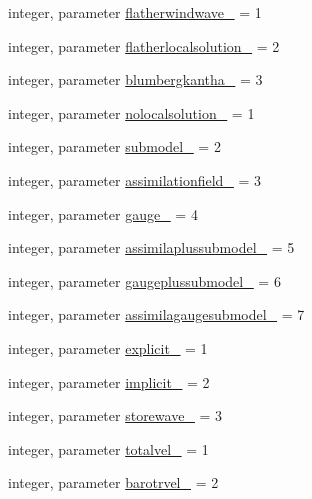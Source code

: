 \begin{DoxyCompactItemize}
\item 
integer, parameter \mbox{\hyperlink{namespacemodulehydrodynamic_afe0c2581319a871292849ef0d657414f}{flatherwindwave\+\_\+}} = 1
\item 
integer, parameter \mbox{\hyperlink{namespacemodulehydrodynamic_a80d3e90e0672cce41d27250b2bd218c1}{flatherlocalsolution\+\_\+}} = 2
\item 
integer, parameter \mbox{\hyperlink{namespacemodulehydrodynamic_a1d590de331d3d84fae20e05e304bbd34}{blumbergkantha\+\_\+}} = 3
\item 
integer, parameter \mbox{\hyperlink{namespacemodulehydrodynamic_acb9771c6b07326240c8f99f13011cdf9}{nolocalsolution\+\_\+}} = 1
\item 
integer, parameter \mbox{\hyperlink{namespacemodulehydrodynamic_a64e6442e629019f176edce6ad54346e0}{submodel\+\_\+}} = 2
\item 
integer, parameter \mbox{\hyperlink{namespacemodulehydrodynamic_a1440e2f034274469fdc93195249c9b56}{assimilationfield\+\_\+}} = 3
\item 
integer, parameter \mbox{\hyperlink{namespacemodulehydrodynamic_a50f71f62021125375c2ed0d192e573fa}{gauge\+\_\+}} = 4
\item 
integer, parameter \mbox{\hyperlink{namespacemodulehydrodynamic_aa3e99181d5aa9739fba1c4a38373b84c}{assimilaplussubmodel\+\_\+}} = 5
\item 
integer, parameter \mbox{\hyperlink{namespacemodulehydrodynamic_a28c716327ca5feea01660b87cd07832f}{gaugeplussubmodel\+\_\+}} = 6
\item 
integer, parameter \mbox{\hyperlink{namespacemodulehydrodynamic_a877761a178361bd0759b6eb504b4261b}{assimilagaugesubmodel\+\_\+}} = 7
\item 
integer, parameter \mbox{\hyperlink{namespacemodulehydrodynamic_a343f819d2ce13e5a48592e61480859e3}{explicit\+\_\+}} = 1
\item 
integer, parameter \mbox{\hyperlink{namespacemodulehydrodynamic_a80b5961d5720bcc727a4d9a385746fb4}{implicit\+\_\+}} = 2
\item 
integer, parameter \mbox{\hyperlink{namespacemodulehydrodynamic_a01481fb764815f271a203b9a3217a82b}{storewave\+\_\+}} = 3
\item 
integer, parameter \mbox{\hyperlink{namespacemodulehydrodynamic_a3817721a2c1e25ad61d2dc3d1e615d01}{totalvel\+\_\+}} = 1
\item 
integer, parameter \mbox{\hyperlink{namespacemodulehydrodynamic_af69ee115e707ec60f646d5fc16cfec7d}{barotrvel\+\_\+}} = 2
\item 

\end{DoxyCompactItemize}
